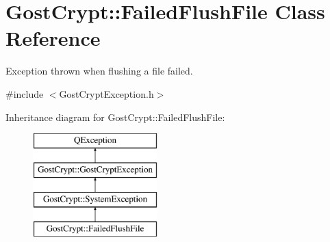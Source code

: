 \hypertarget{class_gost_crypt_1_1_failed_flush_file}{}\section{Gost\+Crypt\+:\+:Failed\+Flush\+File Class Reference}
\label{class_gost_crypt_1_1_failed_flush_file}


Exception thrown when flushing a file failed.  




{\ttfamily \#include $<$Gost\+Crypt\+Exception.\+h$>$}

Inheritance diagram for Gost\+Crypt\+:\+:Failed\+Flush\+File\+:\begin{figure}[H]
\begin{center}
\leavevmode
\includegraphics[height=4.000000cm]{class_gost_crypt_1_1_failed_flush_file}
\end{center}
\end{figure}
